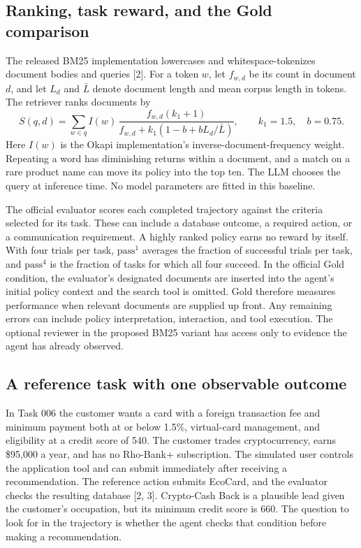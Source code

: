 \documentclass{article}
\begin{document}
\subsection{Ranking, task reward, and the Gold comparison}
The released BM25 implementation lowercases and whitespace-tokenizes document bodies and queries [2]. For a token $w$, let $f_{w,d}$ be its count in document $d$, and let $L_d$ and $\bar L$ denote document length and mean corpus length in tokens. The retriever ranks documents by
\[
 S(q,d)=\sum_{w\in q} I(w)\,
 \frac{f_{w,d}(k_1+1)}
 {f_{w,d}+k_1(1-b+bL_d/\bar L)},\qquad k_1=1.5,\quad b=0.75 .
\]
Here $I(w)$ is the Okapi implementation's inverse-document-frequency weight. Repeating a word has diminishing returns within a document, and a match on a rare product name can move its policy into the top ten. The LLM chooses the query at inference time. No model parameters are fitted in this baseline.

The official evaluator scores each completed trajectory against the criteria selected for its task. These can include a database outcome, a required action, or a communication requirement. A highly ranked policy earns no reward by itself. With four trials per task, $\mathrm{pass}^{1}$ averages the fraction of successful trials per task, and $\mathrm{pass}^{4}$ is the fraction of tasks for which all four succeed. In the official Gold condition, the evaluator's designated documents are inserted into the agent's initial policy context and the search tool is omitted. Gold therefore measures performance when relevant documents are supplied up front. Any remaining errors can include policy interpretation, interaction, and tool execution. The optional reviewer in the proposed BM25 variant has access only to evidence the agent has already observed.
\subsection{A reference task with one observable outcome}
In Task 006 the customer wants a card with a foreign transaction fee and minimum payment both at or below 1.5\%, virtual-card management, and eligibility at a credit score of 540. The customer trades cryptocurrency, earns \$95,000 a year, and has no Rho-Bank+ subscription. The simulated user controls the application tool and can submit immediately after receiving a recommendation. The reference action submits EcoCard, and the evaluator checks the resulting database [2, 3]. Crypto-Cash Back is a plausible lead given the customer's occupation, but its minimum credit score is 660. The question to look for in the trajectory is whether the agent checks that condition before making a recommendation.
\end{document}
